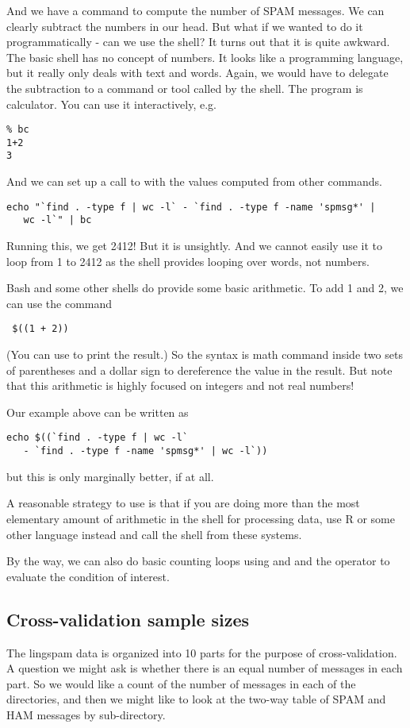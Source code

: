 And we have a command to compute the number of SPAM messages.  We can
clearly subtract the numbers in our head.  But what if we wanted to do
it programmatically - can we use the shell?  It turns out that it is
quite awkward. The basic shell has no concept of numbers.  It looks
like a programming language, but it really only deals with text and
words.  Again, we would have to delegate the subtraction to a command
or tool called by the shell.  The program  is calculator.
You can use it interactively, e.g.
\begin{verbatim}
% bc
1+2
3
\end{verbatim}
And we can set up a call to  with the values
computed from other commands.
\begin{verbatim}
echo "`find . -type f | wc -l` - `find . -type f -name 'spmsg*' | 
   wc -l`" | bc
\end{verbatim}
Running this, we get 2412!  But it is unsightly.
And we cannot easily use it to loop from 1 to 2412 as the
shell provides looping over words, not numbers.

Bash and some other shells do provide some basic arithmetic.
To add 1 and 2, we can use the command
\begin{verbatim}
 $((1 + 2))
\end{verbatim}
(You can use  to print the result.)
So the syntax is
math command inside two sets of parentheses
and a dollar sign to dereference the value in the result.
But note that this arithmetic is highly focused on integers
and not real numbers!

Our example above can be written  as
\begin{verbatim}
echo $((`find . -type f | wc -l` 
   - `find . -type f -name 'spmsg*' | wc -l`))
\end{verbatim}
but this is only marginally better, if at all.


A reasonable strategy to use is that if you are doing
more than the most elementary amount of arithmetic
in the shell for processing data, 
use R or some other language instead and call the shell
from these systems. 


By the way, we can also do basic counting loops using  and 
 and the  operator to
evaluate the condition of interest.

\subsection{Cross-validation sample sizes}
The lingspam data is organized into 10 parts for the purpose of
cross-validation.  A question we might ask is whether there is an
equal number of messages in each part. So we would like a count of the
number of messages in each of the  directories,
and then we might like to look at the two-way table of
SPAM and HAM messages by sub-directory.

